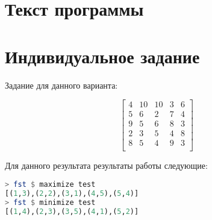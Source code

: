 \documentclass[a4paper,12pt]{article}
\numberwithin{equation}{section}
\begin{document}
\section{Текст программы}



\section{Индивидуальное задание}

Задание для данного варианта:

\[ \left[
\begin{matrix}
  4 & 10 & 10 & 3 & 6 \\
  5 & 6 & 2 & 7 & 4 \\
  9 & 5 & 6 & 8 & 3 \\
  2 & 3 & 5 & 4 & 8 \\
  8 & 5 & 4 & 9 & 3 \\
\end{matrix}
\right] \]

Для данного результата результаты работы следующие:

\begin{lstlisting}[language=Haskell]
> fst $ maximize test
[(1,3),(2,2),(3,1),(4,5),(5,4)]
> fst $ minimize test
[(1,4),(2,3),(3,5),(4,1),(5,2)]
\end{lstlisting}
\end{document}
